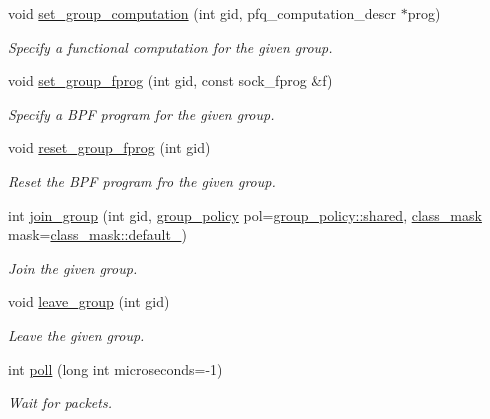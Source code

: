 \begin{DoxyCompactItemize}
void \hyperlink{classnet_1_1pfq_a50af39653699ccbf9c0b2412a17e01a6}{set\-\_\-group\-\_\-computation} (int gid, pfq\-\_\-computation\-\_\-descr $\ast$prog)
\begin{DoxyCompactList}\small\item\em Specify a functional computation for the given group. \end{DoxyCompactList}\item 
void \hyperlink{classnet_1_1pfq_a5290b64ce270cfc46a9fbecc21802cc3}{set\-\_\-group\-\_\-fprog} (int gid, const sock\-\_\-fprog \&f)
\begin{DoxyCompactList}\small\item\em Specify a B\-P\-F program for the given group. \end{DoxyCompactList}\item 
void \hyperlink{classnet_1_1pfq_a4d6b1fb7c2b3538bf7b66fb0a92bf87b}{reset\-\_\-group\-\_\-fprog} (int gid)
\begin{DoxyCompactList}\small\item\em Reset the B\-P\-F program fro the given group. \end{DoxyCompactList}\item 
int \hyperlink{classnet_1_1pfq_ad7e62e04d59c1f2214ff5314bb6b3825}{join\-\_\-group} (int gid, \hyperlink{namespacenet_aedc1a0dde937ddbd0800af02920b1067}{group\-\_\-policy} pol=\hyperlink{namespacenet_aedc1a0dde937ddbd0800af02920b1067a9e81e7b963c71363e2fb3eefcfecfc0e}{group\-\_\-policy\-::shared}, \hyperlink{namespacenet_a1dbd93552dc6ef6fbb0bb79d43ca22fd}{class\-\_\-mask} mask=\hyperlink{namespacenet_a1dbd93552dc6ef6fbb0bb79d43ca22fda172b03053216c6158fe380805998ad6c}{class\-\_\-mask\-::default\-\_\-})
\begin{DoxyCompactList}\small\item\em Join the given group. \end{DoxyCompactList}\item 
void \hyperlink{classnet_1_1pfq_af90932832d9695326df7af8b2d629660}{leave\-\_\-group} (int gid)
\begin{DoxyCompactList}\small\item\em Leave the given group. \end{DoxyCompactList}\item 
int \hyperlink{classnet_1_1pfq_ae082956072242f6a05a9ba3ab076b59e}{poll} (long int microseconds=-\/1)
\begin{DoxyCompactList}\small\item\em Wait for packets. \end{DoxyCompactList}\item 

\end{DoxyCompactItemize}
